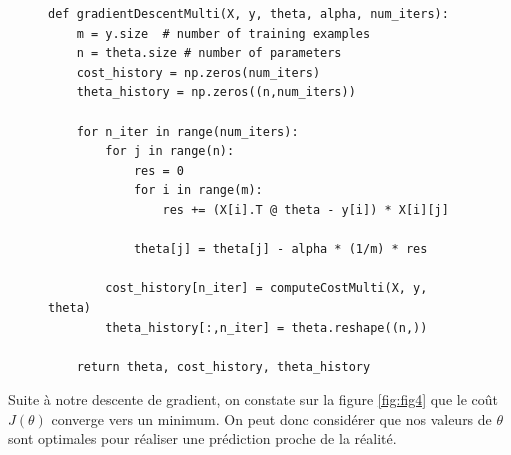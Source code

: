 \begin{figure}[!h]
\begin{verbatim}
def gradientDescentMulti(X, y, theta, alpha, num_iters):  
    m = y.size  # number of training examples
    n = theta.size # number of parameters
    cost_history = np.zeros(num_iters)
    theta_history = np.zeros((n,num_iters))

    for n_iter in range(num_iters):
        for j in range(n):
            res = 0
            for i in range(m):
                res += (X[i].T @ theta - y[i]) * X[i][j]
            
            theta[j] = theta[j] - alpha * (1/m) * res

        cost_history[n_iter] = computeCostMulti(X, y, theta)
        theta_history[:,n_iter] = theta.reshape((n,))
              
    return theta, cost_history, theta_history
\end{verbatim}   
\label{listing:gradientDescentMulti}
\end{figure}


Suite à notre descente de gradient, on constate sur la figure \ref{fig:fig4} que le coût $J(\theta)$ converge vers un minimum. On peut donc considérer que nos valeurs de $\theta$ sont optimales pour réaliser une prédiction proche de la réalité.

